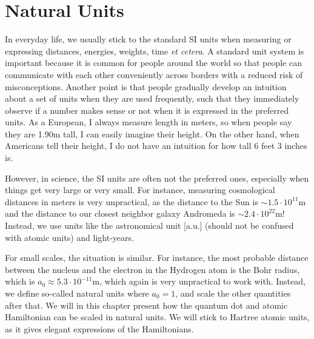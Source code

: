 \chapter{Natural Units} \label{app:units}
In everyday life, we usually stick to the standard SI units when measuring or expressing distances, energies, weights, time \textit{et cetera}. A standard unit system is important because it is common for people around the world so that people can communicate with each other conveniently across borders with a reduced risk of misconceptions. Another point is that people gradually develop an intuition about a set of units when they are used frequently, such that they immediately observe if a number makes sense or not when it is expressed in the preferred units. As a European, I always measure length in meters, so when people say they are 1.90m tall, I can easily imagine their height. On the other hand, when Americans tell their height, I do not have an intuition for how tall 6 feet 3 inches is. 

However, in science, the SI units are often not the preferred ones, especially when things get very large or very small. For instance, measuring cosmological distances in meters is very unpractical, as the distance to the Sun is $\sim1.5\cdot10^{11}$m and the distance to our closest neighbor galaxy Andromeda is $\sim 2.4\cdot10^{22}$m! Instead, we use units like the astronomical unit [a.u.] (should not be confused with atomic units) and light-years. 

For small scales, the situation is similar. For instance, the most probable distance between the nucleus and the electron in the Hydrogen atom is the Bohr radius, which is $a_0\approx5.3\cdot10^{-11}$m, which again is very unpractical to work with. Instead, we define so-called natural units where $a_0=1$, and scale the other quantities after that. We will in this chapter present how the quantum dot and atomic Hamiltonian can be scaled in natural units. We will stick to Hartree atomic units, as it gives elegant expressions of the Hamiltonians.  

